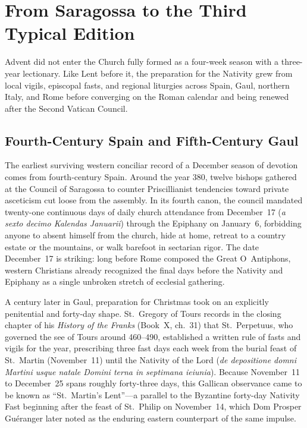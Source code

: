 \section{From Saragossa to the Third Typical Edition}\label{sec:history}

Advent did not enter the Church fully formed as a four-week season with a three-year lectionary. Like Lent before it, the preparation for the Nativity grew from local vigils, episcopal fasts, and regional liturgies across Spain, Gaul, northern Italy, and Rome before converging on the Roman calendar and being renewed after the Second Vatican Council.

\subsection{Fourth-Century Spain and Fifth-Century Gaul}

The earliest surviving western conciliar record of a December season of devotion comes from fourth-century Spain. Around the year 380, twelve bishops gathered at the Council of Saragossa to counter Priscillianist tendencies toward private asceticism cut loose from the assembly. In its fourth canon, the council mandated twenty-one continuous days of daily church attendance from December~17 (\textit{a sexto decimo Kalendas Januarii}) through the Epiphany on January~6, forbidding anyone to absent himself from the church, hide at home, retreat to a country estate or the mountains, or walk barefoot in sectarian rigor. The date December~17 is striking: long before Rome composed the Great O~Antiphons, western Christians already recognized the final days before the Nativity and Epiphany as a single unbroken stretch of ecclesial gathering.

A century later in Gaul, preparation for Christmas took on an explicitly penitential and forty-day shape. St.~Gregory of Tours records in the closing chapter of his \textit{History of the Franks} (Book~X, ch.~31) that St.~Perpetuus, who governed the see of Tours around 460--490, established a written rule of fasts and vigils for the year, prescribing three fast days each week from the burial feast of St.~Martin (November~11) until the Nativity of the Lord (\textit{de depositione domni Martini usque natale Domini terna in septimana ieiunia}). Because November~11 to December~25 spans roughly forty-three days, this Gallican observance came to be known as ``St.~Martin's Lent''---a parallel to the Byzantine forty-day Nativity Fast beginning after the feast of St.~Philip on November~14, which Dom Prosper Gu\'eranger later noted as the enduring eastern counterpart of the same impulse.

